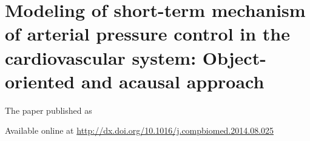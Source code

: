 \chapter{Modeling of short-term mechanism of arterial pressure control in the cardiovascular system: Object-oriented and acausal approach}\label{app:modeling}
The paper \cite{Kulhanek2014Modeling} published as
 

Available online at \url{http://dx.doi.org/10.1016/j.compbiomed.2014.08.025}


